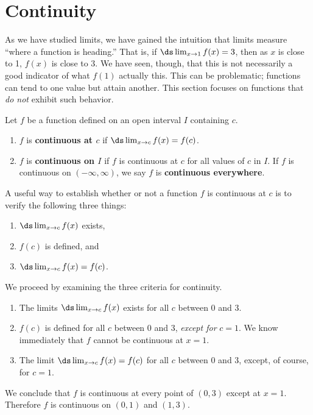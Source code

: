 \section{Continuity}\label{sec:continuity}
As we have studied limits, we have gained the intuition that limits measure ``where a function is heading.'' That is, if $\ds \lim_{x\to 1} f(x) = 3$, then as $x$ is close to 1, $f(x)$ is close to 3. We have seen, though, that this is not necessarily a good indicator of what $f(1)$ actually this. This can be problematic; functions can tend to one value but attain another. This section focuses on functions that \textit{do not} exhibit such behavior.

{Let $f$ be a function defined on an open interval $I$ containing $c$.  
	\begin{enumerate}
	\item		$f$ is \textbf{continuous at $c$} if $\ds \lim_{x\to c}f(x) = f(c)$.
	\item		$f$ is \textbf{continuous on $I$} if $f$ is continuous at $c$ for all values of $c$ in $I$. If $f$ is continuous on $(-\infty,\infty)$, we say $f$ is \textbf{continuous everywhere}.
	\end{enumerate}
}

A useful way to establish whether or not a function $f$ is continuous at $c$ is to verify the following three things:
		\begin{enumerate}
		\item		$\ds \lim_{x\to c} f(x)$ exists,
		\item		$f(c)$ is defined, and 
		\item		$\ds \lim_{x\to c} f(x) = f(c)$.
		\end{enumerate}
		
{We proceed by examining the three criteria for continuity.
	\begin{enumerate}
	\item		The limits $\ds \lim_{x\to c} f(x)$ exists for all $c$ between 0 and 3.
	\item		$f(c)$ is defined for all $c$ between 0 and 3, \textit{except for} $c=1$. We know immediately that $f$ cannot be continuous at $x=1$.
	\item		The limit $\ds \lim_{x\to c} f(x) = f(c)$ for all $c$ between 0 and 3, except, of course, for $c=1$. 
	\end{enumerate}

We conclude that $f$ is continuous at every point of $(0,3)$ except at $x=1$. Therefore $f$ is continuous on $(0,1)$ and $(1,3)$.}\\

